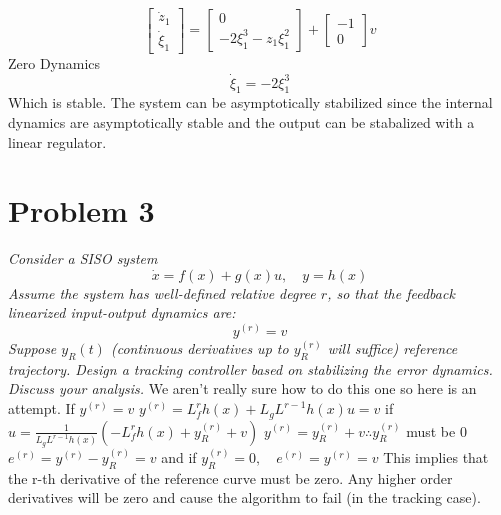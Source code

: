 \documentclass{article}
\begin{document}
\begin{enumerate}[(1)]
$$
\begin{bmatrix}
\dot{z}_1 \\
\dot{\xi}_1
\end{bmatrix}
=
\begin{bmatrix}
0 \\
-2\xi_1^3 - z_1\xi_1^2
\end{bmatrix}
+
\begin{bmatrix}
-1 \\
0
\end{bmatrix}
v
$$
Zero Dynamics
$$ \dot{\xi}_1 = -2\xi_1^3 $$
Which is stable.
The system can be asymptotically stabilized since the internal dynamics are asymptotically stable and the output can be stabalized with a linear regulator.


\end{enumerate}

\newpage
\section*{Problem 3}
\emph{Consider a SISO system}
$$ \dot{x} = f(x) + g(x)u, \quad y=h(x) $$
\emph{Assume the system has well-defined relative degree $r$, so that the feedback linearized input-output dynamics are:}
$$ y^{(r)}=v $$
\emph{Suppose $y_R(t)$ (continuous derivatives up to $y_R^{(r)}$ will suffice) reference trajectory.
      Design a tracking controller based on stabilizing the error dynamics.
      Discuss your analysis.}
\newline
\newline
We aren't really sure how to do this one so here is an attempt.
\newline
If $y^{(r)} = v$
\newline
$y^{(r)} = L_f^rh(x) + L_gL^{r-1}h(x)u = v$
\newline
if $u = \frac{1}{L_gL^{r-1}h(x)}(-L_f^rh(x)+y_R^{(r)} + v)$
\newline
$y^{(r)} = y_R^{(r)} + v \therefore y_R^(r)$ must be $0$
\newline
$e^{(r)} = y^{(r)}-y_R^{(r)}=v $ and if $y_R^{(r)} = 0, \quad e^{(r)}=y^{(r)}=v$
\newline
This implies that the r-th derivative of the reference curve must be zero.
Any higher order derivatives will be zero and cause the algorithm to fail (in the tracking case).
\end{document}
